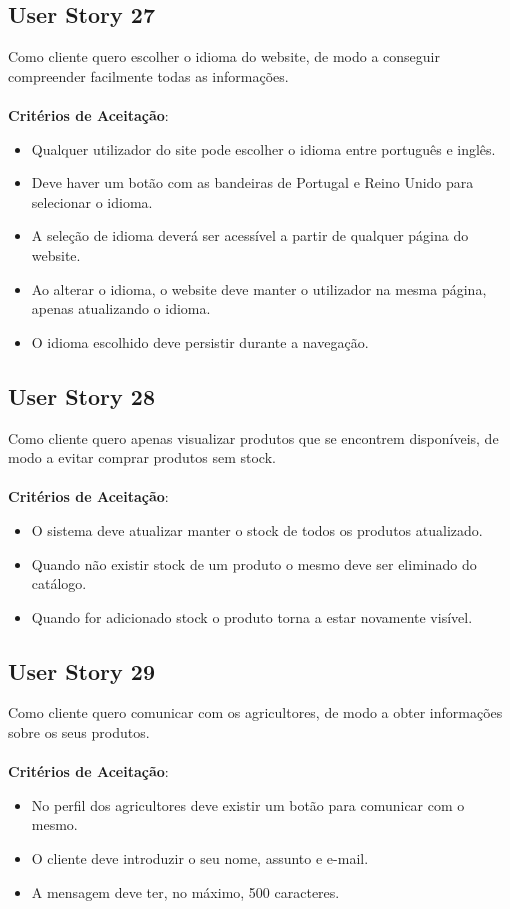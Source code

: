 \documentclass[a4paper,11pt]{article}
\begin{document}
\subsection{User Story 27}
Como cliente quero escolher o idioma do website, de modo a conseguir compreender facilmente todas as informações.\\\\
\textbf{Critérios de Aceitação}:
\begin{itemize}
  \item Qualquer utilizador do site pode escolher o idioma entre português e inglês.
  \item Deve haver um botão com as bandeiras de Portugal e Reino Unido para selecionar o idioma.
  \item A seleção de idioma deverá ser acessível a partir de qualquer página do website.
  \item Ao alterar o idioma, o website deve manter o utilizador na mesma página, apenas atualizando o idioma.
  \item O idioma escolhido deve persistir durante a navegação.
\end{itemize}
\subsection{User Story 28}
Como cliente quero apenas visualizar produtos que se encontrem disponíveis, de modo a evitar comprar produtos sem stock.\\\\
\textbf{Critérios de Aceitação}:
\begin{itemize}
  \item O sistema deve atualizar manter o stock de todos os produtos atualizado.
  \item Quando não existir stock de um produto o mesmo deve ser eliminado do catálogo.
  \item Quando for adicionado stock o produto torna a estar novamente visível.
\end{itemize}
\subsection{User Story 29}
Como cliente quero comunicar com os agricultores, de modo a obter informações sobre os seus produtos.\\\\
\textbf{Critérios de Aceitação}:
\begin{itemize}
  \item No perfil dos agricultores deve existir um botão para comunicar com o mesmo.
  \item O cliente deve introduzir o seu nome, assunto e e-mail.
  \item A mensagem deve ter, no máximo, 500 caracteres.
\end{itemize}
\end{document}
